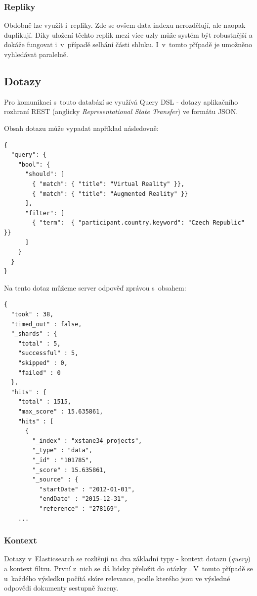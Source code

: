 \subsubsection*{Repliky}
Obdobně lze využít i~repliky. Zde se ovšem data indexu nerozdělují, ale naopak duplikují. Díky uložení těchto replik mezi více uzly může systém být robustnější a dokáže fungovat i~v~případě selhání části shluku. I~v~tomto případě je umožněno vyhledávat paralelně. 

\subsection{Dotazy}
Pro komunikaci s~touto databází se využívá Query DSL - dotazy aplikačního rozhraní REST (anglicky \emph{Representational State Transfer}) ve formátu JSON.

Obsah dotazu může vypadat například následovně:
\begin{verbatim}
{
  "query": { 
    "bool": { 
      "should": [
        { "match": { "title": "Virtual Reality" }}, 
        { "match": { "title": "Augmented Reality" }}  
      ],
      "filter": [ 
        { "term":  { "participant.country.keyword": "Czech Republic" }}
      ]
    }
  }
}
\end{verbatim}

\blindtext

Na tento dotaz můžeme server odpověď zprávou s~obsahem:

\begin{verbatim}
{
  "took" : 38,
  "timed_out" : false,
  "_shards" : {
    "total" : 5,
    "successful" : 5,
    "skipped" : 0,
    "failed" : 0
  },
  "hits" : {
    "total" : 1515,
    "max_score" : 15.635861,
    "hits" : [
      {
        "_index" : "xstane34_projects",
        "_type" : "data",
        "_id" : "101785",
        "_score" : 15.635861,
        "_source" : {
          "startDate" : "2012-01-01",
          "endDate" : "2015-12-31",
          "reference" : "278169",
    ...
\end{verbatim}

\blindtext


\subsubsection*{Kontext}
Dotazy v~Elasticsearch se rozlišují na dva základní typy - kontext dotazu (\emph{query}) a kontext filtru.
První z~nich se dá lidsky přeložit do otázky . V~tomto případě se u~každého výsledku počítá skóre relevance, podle kterého jsou ve výsledné odpovědi dokumenty sestupně řazeny.


